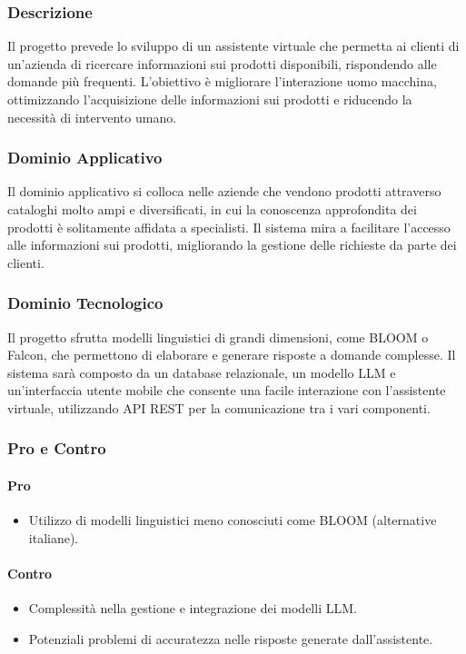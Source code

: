 \documentclass{article}
\begin{document}
\subsubsection{Descrizione}
Il progetto prevede lo sviluppo di un assistente virtuale che permetta ai clienti 
di un'azienda di ricercare informazioni sui prodotti disponibili, 
rispondendo alle domande più frequenti. L'obiettivo è migliorare l'interazione uomo macchina, 
ottimizzando l'acquisizione delle informazioni sui prodotti e riducendo la necessità di intervento umano.

\subsubsection{Dominio Applicativo}
Il dominio applicativo si colloca nelle aziende che vendono prodotti attraverso 
cataloghi molto ampi e diversificati, in cui la conoscenza approfondita dei prodotti è 
solitamente affidata a specialisti. Il sistema mira a facilitare l'accesso alle informazioni sui prodotti, 
migliorando la gestione delle richieste da parte dei clienti.

\subsubsection{Dominio Tecnologico}
Il progetto sfrutta modelli linguistici di grandi dimensioni, 
come BLOOM o Falcon, che permettono di elaborare e generare risposte a domande complesse. 
Il sistema sarà composto da un database relazionale, un modello LLM e un’interfaccia 
utente mobile che consente una facile interazione con l'assistente virtuale, 
utilizzando API REST per la comunicazione tra i vari componenti.

\subsubsection{Pro e Contro}

\paragraph{Pro}
\begin{itemize}
    \item Utilizzo di modelli linguistici meno conosciuti come BLOOM (alternative italiane).
\end{itemize}

\paragraph{Contro}
\begin{itemize}
    \item Complessità nella gestione e integrazione dei modelli LLM.
    \item Potenziali problemi di accuratezza nelle risposte generate dall'assistente.
\end{itemize}
\end{document}
